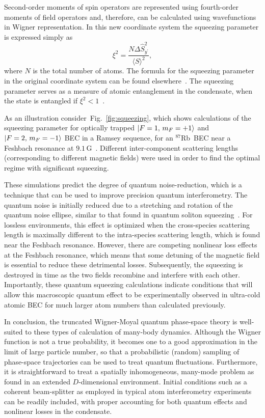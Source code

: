 \documentclass[aps,prl,twocolumn,showpacs,amsmath,amssymb,superscriptaddress,flushbottom,noraggedfooter]{revtex4-1}
\newcommand{\Rb}{$^{87}$Rb}
\newcommand{\figref}[1]{Fig.~\ref{#1}}
\newcommand{\ket}[1]{\mbox{\ensuremath{\vert #1 \rangle}}}
\begin{document}
Second-order moments of spin operators are represented using fourth-order moments of field operators
and, therefore, can be calculated using wavefunctions in Wigner representation.
In this new coordinate system the squeezing parameter is expressed simply as
\begin{equation}
\label{eqn:squeezing}
	\xi^2 = \frac{N \Delta \hat{S}^2_{y^\prime}}{\langle S \rangle^2},
\end{equation}
where $N$ is the total number of atoms.
The formula for the squeezing parameter in the original coordinate system can be found elsewhere~\cite{Li2009}.
The squeezing parameter serves as a measure of atomic entanglement in the condensate,
when the state is entangled if $\xi^2 < 1$~\cite{Sorensen2001}.

As an illustration consider~\figref{fig:squeezing}, which shows calculations of the squeezing parameter
for optically trapped ${\ket{F=1,\, m_F=+1}}$ and ${\ket{F=2,\, m_F=-1}}$ BEC in a Ramsey sequence,
for an \Rb~BEC near a Feshbach resonance at $9.1\,\mathrm{G}$~\cite{Kaufman2009}.
Different inter-component scattering lengths (corresponding to different magnetic fields)
were used in order to find the optimal regime with significant squeezing.

These simulations predict the degree of quantum noise-reduction, which
is a technique that can be used to improve precision quantum interferometry.
The quantum noise is initially reduced due to a stretching and rotation
of the quantum noise ellipse, similar to that found in quantum soliton
squeezing~\cite{Carter1987,Drummond1993a}.
For lossless environments, this effect is optimized when the cross-species
scattering length is maximally different to the intra-species scattering
length, which is found near the Feshbach resonance.
However, there are competing nonlinear loss effects at the Feshbach resonance,
which means that some detuning of the magnetic field is essential to reduce
these detrimental losses.
Subsequently, the squeezing is destroyed in time as the two fields recombine
and interfere with each other.
Importantly, these quantum squeezing calculations indicate conditions that
will allow this macroscopic quantum effect to be experimentally
observed in ultra-cold atomic BEC for much larger atom
numbers than calculated previously.

In conclusion, the truncated Wigner-Moyal quantum phase-space theory is
well-suited to these types of calculation of many-body dynamics.
Although the Wigner function is not a true probability, it becomes one
to a good approximation in the limit of large particle number, so that
a probabilistic (random) sampling of phase-space trajectories can be used
to treat quantum fluctuations.
Furthermore, it is straightforward to treat a spatially inhomogeneous,
many-mode problem as found in an extended $D$-dimensional environment.
Initial conditions such as a coherent beam-splitter as employed in typical
atom interferometry experiments can be readily included,
with proper accounting for both quantum effects and nonlinear losses in the condensate.


\end{document}
